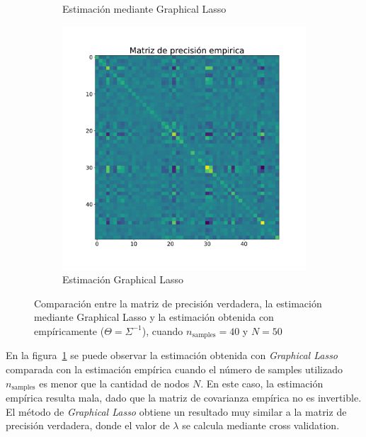 \documentclass{article}
\begin{document}
\begin{figure}[htb]
\begin{subfigure}[t]{0.32\linewidth}
        \caption{Estimación mediante Graphical Lasso}
    \end{subfigure}\hfill
    \begin{subfigure}[t]{0.32\linewidth}
        \centering
        \includegraphics[width=\textwidth]{imagenes/graphical_lasso/estimated_sample.pdf}
        \caption{Estimación Graphical Lasso}
    \end{subfigure}
    \caption{Comparación entre la matriz de precisión verdadera, la estimación mediante Graphical Lasso y la estimación obtenida con empíricamente ($\Theta = \Sigma^{-1}$), cuando $n_{\text{samples}}=40$ y $N=50$}
    \label{fig:graphical_lasso_triptych}
\end{figure}
En la figura~\ref{fig:graphical_lasso_triptych} se puede observar la estimación obtenida con \emph{Graphical Lasso} comparada con la estimación empírica cuando el número de samples utilizado $n_{\text{samples}}$ es menor que la cantidad de nodos $N$. En este caso, la estimación
empírica resulta mala, dado que la matriz de covarianza empírica no es invertible. El método de \emph{Graphical Lasso} obtiene un resultado muy similar a la matriz de precisión verdadera, donde el valor de $\lambda$ se calcula mediante cross validation. 
\end{document}
